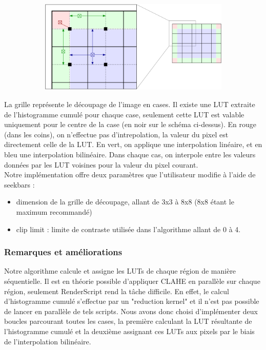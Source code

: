\begin{figure}[!h]
    \centering
    \begin{subfigure}[b]{0.8\textwidth}
        \includegraphics[width=1\textwidth]{report_src/CLAHE.png}
    \end{subfigure}
\end{figure} 

La grille représente le découpage de l'image en cases. Il existe une LUT extraite de l'histogramme cumulé pour chaque case,
seulement cette LUT est valable uniquement pour le centre de la case (en noir sur le schéma ci-dessus). 
En rouge (dans les coins), on n'effectue pas d'intrepolation, la valeur du pixel est directement celle de la LUT. En vert, 
on applique une interpolation linéaire, et en bleu une interpolation bilinéaire. Dans chaque cas, on interpole entre les valeurs
données par les LUT voisines pour la valeur du pixel courant.
\\

Notre implémentation offre deux paramètres que l'utilisateur modifie à l'aide de seekbars :
\begin{itemize}
    \item{dimension de la grille de découpage, allant de 3x3 à 8x8 (8x8 étant le maximum recommandé)}
    \item{clip limit : limite de contraste utilisée dans l'algorithme allant de 0 à 4.}
\end{itemize}

\subsubsection{Remarques et améliorations}

Notre algorithme calcule et assigne les LUTs de chaque région de manière séquentielle. Il est en théorie possible d'appliquer CLAHE en parallèle
sur chaque région, seulement RenderScript rend la tâche difficile. En effet, le calcul d'histogramme cumulé s'effectue par un "reduction kernel" et il n'est 
pas possible de lancer en parallèle de tels scripts. Nous avons donc choisi d'implémenter deux boucles parcourant toutes les cases,
la première calculant la LUT résultante de l'histogramme cumulé et la deuxième assignant ces LUTs aux pixels par le biais de l'interpolation bilinéaire.
\\

